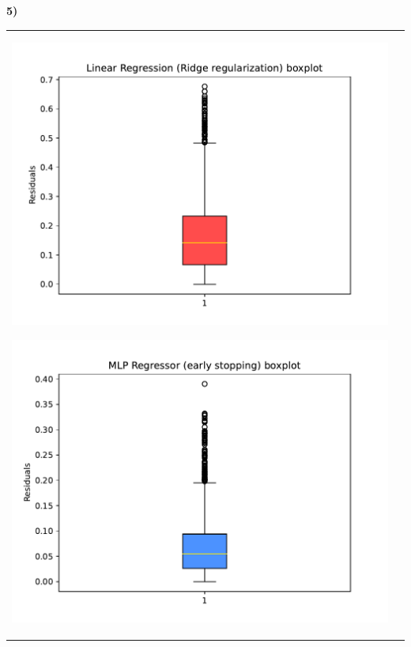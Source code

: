 \documentclass[11pt,a4paper]{article}
\begin{document}
\begin{flushleft}
\vspace{-3mm}
\textbf{5)}\vspace{-1mm}
\begin{tabularx}{1.09\textwidth} {X X}
  \hspace{-7.25mm}\includegraphics[scale=0.6]{hw03_plot_linreg_box} \par
  \vspace{-2mm}\hspace{-7.25mm}\includegraphics[scale=0.6]{hw03_plot_mlp1_box} \par
  &

\end{tabularx}
\end{flushleft}
\end{document}
